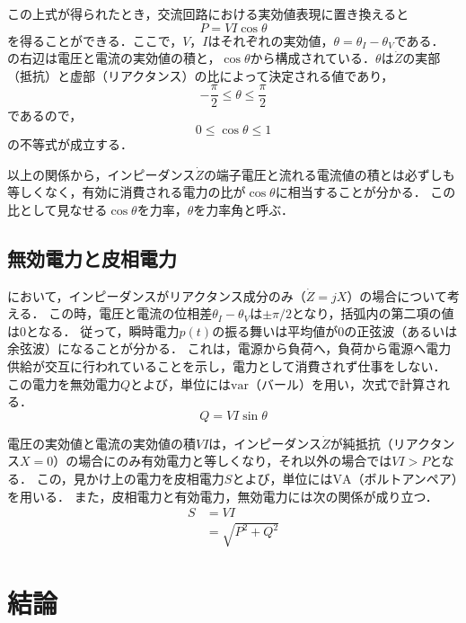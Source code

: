 \documentclass[11pt,dvipdfmx]{ujarticle}
\begin{document}
この上式が得られたとき，交流回路における実効値表現に置き換えると
\begin{equation}
	P = VI\cos\theta
	\label{eq:power}
\end{equation}
を得ることができる．ここで，$V$，$I$はそれぞれの実効値，$\theta=\theta_I-\theta_V$である．
の右辺は電圧と電流の実効値の積と，$\cos\theta$から構成されている．$\theta$は$\dot{Z}$の実部（抵抗）と虚部（リアクタンス）の比によって決定される値であり，
\begin{equation}
	-\frac{\pi}{2}\leq\theta\leq\frac{\pi}{2}
\end{equation}
であるので，
\begin{equation}
	0\leq\cos\theta\leq 1
\end{equation}
の不等式が成立する．

以上の関係から，インピーダンス$\dot{Z}$の端子電圧と流れる電流値の積とは必ずしも等しくなく，有効に消費される電力の比が$\cos\theta$に相当することが分かる．
この比として見なせる$\cos\theta$を力率，$\theta$を力率角と呼ぶ．

\subsection{無効電力と皮相電力}
において，インピーダンスがリアクタンス成分のみ（$\dot{Z}=jX$）の場合について考える．
この時，電圧と電流の位相差$\theta_I-\theta_V$は$\pm\pi/2$となり，括弧内の第二項の値は0となる．
従って，瞬時電力$p(t)$の振る舞いは平均値が0の正弦波（あるいは余弦波）になることが分かる．
これは，電源から負荷へ，負荷から電源へ電力供給が交互に行われていることを示し，電力として消費されず仕事をしない．
この電力を無効電力$Q$とよび，単位には$\mathrm{var}$（バール）を用い，次式で計算される．
\begin{equation}
	Q = VI \sin \theta
\end{equation}

電圧の実効値と電流の実効値の積$VI$は，インピーダンス$\dot{Z}$が純抵抗（リアクタンス$X=0$）の場合にのみ有効電力と等しくなり，それ以外の場合では$VI> P$となる．
この，見かけ上の電力を皮相電力$S$とよび，単位には$\mathrm{VA}$（ボルトアンペア）を用いる．
また，皮相電力と有効電力，無効電力には次の関係が成り立つ．
\begin{align}
	S &= VI\nonumber\\
	&= \sqrt{P^2+Q^2}
\end{align}




\section{結論}

\newpage
\printbibliography[title=参考文献]
\end{document}
